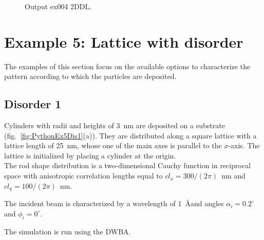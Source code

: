 \begin{figure}[H]
\hfill
{}
\hfill
{}
\hfill
\caption{Output ex004 2DDL.}
\end{figure}

\newpage
\section{Example 5: Lattice with disorder}
The examples of this section focus on the available options to characterize the pattern according to which the particles are deposited.


\subsection{Disorder 1} \label{sec:ex005Dis1}
Cylinders with radii and heights of 3~nm are deposited on a substrate (fig.~\ref{fig:PythonEx5Dis1}(a)). They are distributed along a square lattice with a lattice length of 25~nm, whose one of the main axes is parallel to the $x$-axis. The lattice is initialized by placing a cylinder at the origin.\\ The rod shape distribution is a two-dimensional Cauchy function in reciprocal space with anisotropic correlation lengths equal to $cl_x=300/(2\pi)$~nm and $cl_y=100/(2\pi)$~nm.


The incident beam is characterized by a wavelength of 1~\AA and angles $\alpha_i=0.2^{\circ}$ and $\phi_i=0^{\circ}$.
 
The simulation is run using the DWBA.

